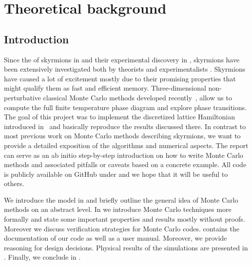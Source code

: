 %
\chapter{Theoretical background}\label{chap:1}
%
\section{Introduction}\label{sec:intro}
%
Since the  of skyrmions in 
 and their experimental discovery in  ,
skyrmions have been extensively investigated both by theorists and
experimentalists . Skyrmions have caused a lot of excitement
mostly due to their promising properties that might qualify them as fast and
efficient memory. Three-dimensional non-perturbative classical Monte Carlo
methods developed recently~\cite{skyrmionlattice}, allow us to compute the full
finite temperature phase diagram and explore phase transitions. The goal of this
project was to implement the discretized lattice Hamiltonian introduced
in~\cite{skyrmionlattice} and basically reproduce the results discussed there.
In contrast to most previous work on Monte Carlo methods describing skyrmions,
we want to provide a detailed exposition of the algorithms and numerical
aspects. The report can serve as an ab initio step-by-step introduction on how
to write Monte Carlo methods and associated pitfalls or caveats based on a
concrete example. All code is publicly available on GitHub under
 and we hope that it will be useful to others.

We introduce the model in  and briefly outline the general
idea of Monte Carlo methods on an abstract level. In  we
introduce Monte Carlo techniques more formally and state some important
properties and results mostly without proofs. Moreover we discuss verification
strategies for Monte Carlo codes.  contains the documentation
of our code as well as a user manual. Moreover, we provide reasoning for design
decisions. Physical results of the simulations are presented in
. Finally, we conclude in .
%
